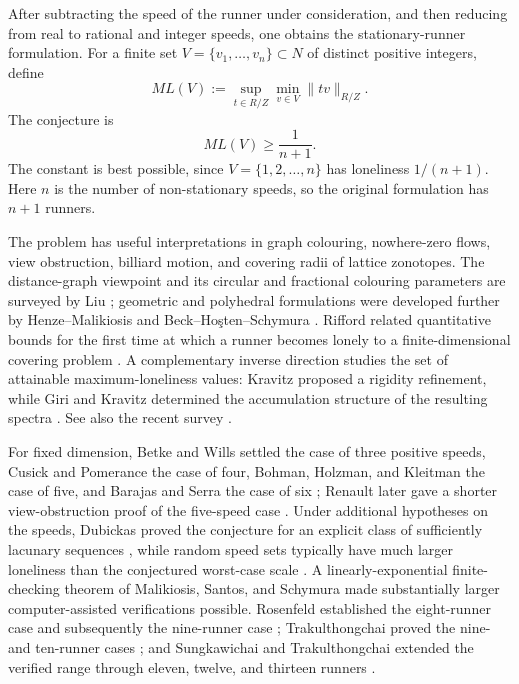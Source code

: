 \documentclass[11pt,reqno]{amsart}
\numberwithin{equation}{section}
\theoremstyle{definition}
\theoremstyle{remark}
\newcommand{\norm}[1]{\lVert#1\rVert}
\def\mathbb#1{#1}%
\def\operatorname#1{#1}%
\begin{document}
After subtracting the speed of the runner under consideration, and then reducing from real to rational and integer speeds, one obtains the stationary-runner formulation.  For a finite set $V=\{v_1,\ldots,v_n\}\subset\mathbb N$ of distinct positive integers, define
\begin{equation}\label{eq:ML-classical}
 \operatorname{ML}(V)
 :=\sup_{t\in\mathbb R/\mathbb Z}
   \min_{v\in V}\norm{tv}_{\mathbb R/\mathbb Z}.
\end{equation}
The conjecture is
\begin{equation}\label{eq:LRC-classical}
 \operatorname{ML}(V)\ge\frac1{n+1}.
\end{equation}
The constant is best possible, since $V=\{1,2,\ldots,n\}$ has loneliness $1/(n+1)$.  Here $n$ is the number of non-stationary speeds, so the original formulation has $n+1$ runners.

The problem has useful interpretations in graph colouring, nowhere-zero flows, view obstruction, billiard motion, and covering radii of lattice zonotopes.  The distance-graph viewpoint and its circular and fractional colouring parameters are surveyed by Liu \cite{LiuSurvey}; geometric and polyhedral formulations were developed further by Henze--Malikiosis and Beck--Ho\c{s}ten--Schymura \cite{HenzeMalikiosis,BeckHostenSchymura}.  Rifford related quantitative bounds for the first time at which a runner becomes lonely to a finite-dimensional covering problem \cite{Rifford}.  A complementary inverse direction studies the set of attainable maximum-loneliness values: Kravitz proposed a rigidity refinement, while Giri and Kravitz determined the accumulation structure of the resulting spectra \cite{Kravitz,GiriKravitz}.  See also the recent survey \cite{PerarnauSerraSurvey}.

For fixed dimension, Betke and Wills settled the case of three positive speeds, Cusick and Pomerance the case of four, Bohman, Holzman, and Kleitman the case of five, and Barajas and Serra the case of six \cite{BetkeWills,CusickPomerance,BohmanHolzmanKleitman,BarajasSerra}; Renault later gave a shorter view-obstruction proof of the five-speed case \cite{Renault}.  Under additional hypotheses on the speeds, Dubickas proved the conjecture for an explicit class of sufficiently lacunary sequences \cite{Dubickas}, while random speed sets typically have much larger loneliness than the conjectured worst-case scale \cite{CzerwinskiRandom}.  A linearly-exponential finite-checking theorem of Malikiosis, Santos, and Schymura \cite{MalikiosisSantosSchymura} made substantially larger computer-assisted verifications possible.  Rosenfeld established the eight-runner case and subsequently the nine-runner case \cite{Rosenfeld,RosenfeldNine}; Trakulthongchai proved the nine- and ten-runner cases \cite{Trakulthongchai}; and Sungkawichai and Trakulthongchai extended the verified range through eleven, twelve, and thirteen runners \cite{SungkawichaiTrakulthongchai}.
\end{document}
